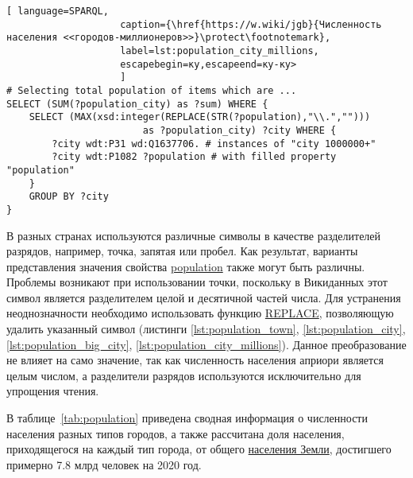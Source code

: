 \begin{lstlisting}[ language=SPARQL, 
                    caption={\href{https://w.wiki/jgb}{Численность населения <<городов-миллионеров>>}\protect\footnotemark},
                    label=lst:population_city_millions, 
                    escapebegin=ку,escapeend=ку-ку>
                    ]
# Selecting total population of items which are ...
SELECT (SUM(?population_city) as ?sum) WHERE {
	SELECT (MAX(xsd:integer(REPLACE(STR(?population),"\\.",""))) 
						as ?population_city) ?city WHERE {
		?city wdt:P31 wd:Q1637706. # instances of "city 1000000+"
		?city wdt:P1082 ?population # with filled property "population"
	}
	GROUP BY ?city
}
\end{lstlisting}

В разных странах используются различные символы в качестве разделителей разрядов, например, точка, запятая или пробел. Как результат, варианты представления значения свойства \href{https://www.wikidata.org/wiki/Property:P1082}{population} также могут быть различны. Проблемы возникают при использовании точки, поскольку в Викиданных этот символ является разделителем целой и десятичной частей числа. Для устранения неоднозначности необходимо использовать функцию \href{https://en.wikibooks.org/wiki/SPARQL/Expressions\_and\_Functions\#REPLACE}{REPLACE}, позволяющую удалить указанный символ (листинги \ref{lst:population_town}, \ref{lst:population_city}, \ref{lst:population_big_city}, \ref{lst:population_city_millions}). Данное преобразование не влияет на само значение, так как численность населения априори является целым числом, а разделители разрядов используются исключительно для упрощения чтения.

В таблице~\ref{tab:population} приведена сводная информация о численности населения разных типов городов, а также рассчитана доля населения, приходящегося на каждый тип города, от общего \href{https://bit.ly/3pgnMss}{населения Земли}, достигшего примерно \num{7,8} млрд человек на 2020 год.

